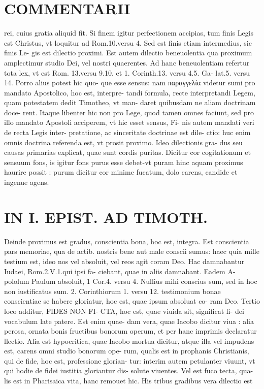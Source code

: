 \documentclass{article}
\begin{document}
\begin{pages}
\section*{COMMENTARII }\pstart rei, cuius gratia aliquid fit. Si finem igitur perfectionem accipias, tum finis Legis est Christus, vt loquitur ad Rom.10.versu 4. Sed est finis etiam intermedius, sic finis Le- gis est dilectio proximi. Est autem dilectio beneuolentia qua proximum amplectimur studio Dei, vel nostri quaerentes. Ad hanc beneuolentiam refertur tota lex, vt est Rom. 13.versu 9.10. et 1. Corinth.13. versu 4.5. Ga- lat.5. versu 14. Porro alius potest hic quo- que esse sensus: nam παραγγελία videtur sumi pro mandato Apostolico, hoc est, interpre- tandi formula, recte interpretandi Legem, quam potestatem dedit Timotheo, vt man- daret quibusdam ne aliam doctrinam doce- rent. Itaque libenter hic non pro Lege, quod tamen omnes faciunt, sed pro illo mandato Apostoli acciperem, vt hic esset sensus, Fi- nis autem mandati veri de recta Legis inter- pretatione, ac sinceritate doctrinae est dile- ctio: huc enim omnis doctrina referenda est, vt prosit proximo. Ideo dilectionis gra- dus seu causas primarias explicat, quae sunt cordis puritas. Dicitur cor cogitationum et sensuum fons, is igitur fons purus esse debet-vt puram hinc aquam proximus haurire possit : purum dicitur cor minime fucatum, dolo carens, candide et ingenue agens.  \pend
\section*{IN I. EPIST. AD TIMOTH. }\pstart Deinde proximus est gradus, conscientia bona, hoc est, integra. Est conscientia pars memoriae, qua de actib. nostris bene aut male conscii sumus: haec quia mille testium est, ideo nos vel absoluit, vel reos agit coram Deo. Hac damnabantur Iudaei, Rom.2.V.1.qui ipsi fa- ciebant, quae in aliis damnabant. Eadem A- pololum Paulum absoluit, 1 Cor.4. versu 4. Nullius mihi conscius sum, sed in hoc non iustificatus sum. 2. Corinthiorum 1. versu 12. testimonium bonae conscientiae se habere gloriatur, hoc est, quae ipsum absoluat co- ram Deo.  \pend\pstart Tertio loco additur, FIDES NON FI- CTA, hoc est, quae viuida sit, significat fi- dei vocabulum late patere. Est enim quae- dam vera, quae Iacobo dicitur viua : alia perosa, ornata bonis fructibus bonorum operum, et per hanc imprimis declaratur llectio. Alia est hypocritica, quae Iacobo mortua dicitur, atque illa vel impudens est, carens omni studio bonorum ope- rum, qualis est in prophanis Christianis, qui de fide, hoc est, professione glorian- tur: interim autem petulanter viuunt, vt qui hodie de fidei iustitia gloriantur dis- solute viuentes. Vel est fuco tecta, qua- lis est in Pharisaica vita, hanc remouet hic. His tribus gradibus vera dilectio est  \pend
\marginpar{[ p.23 ]}

\end{pages}
\end{document}
